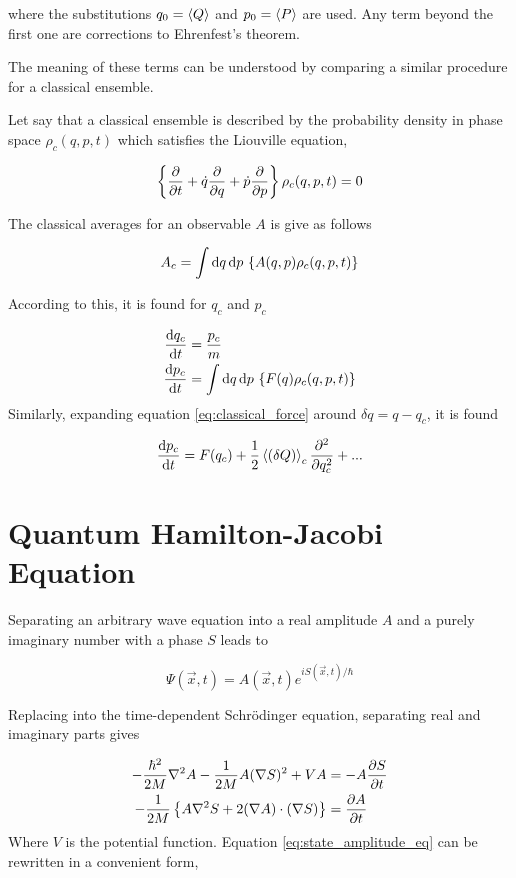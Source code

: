 where the substitutions $q_0 = \left\langle Q \right\rangle$ and $p_0 = \left\langle P \right\rangle$ are used. Any term beyond the first one are corrections to Ehrenfest's theorem.

The meaning of these terms can be understood by comparing a similar procedure for a classical ensemble. 

Let say that a classical ensemble is described by the probability density in phase space $\rho_c(q, p, t)$ which satisfies the Liouville equation,

\begin{equation}
    \left\{\frac{\partial }{\partial t} + \dot q \frac{\partial }{\partial q} + \dot p \frac{\partial }{\partial p}\right\}\rho_c(q, p, t) = 0 
\end{equation}

The classical averages for an observable $A$ is give as follows

\begin{equation}
    A_c = \int \text d{q}\,\text d{p} \,\left\{A(q,p)\rho_c(q, p, t)\right \}
\end{equation}

According to this, it is found for $q_c$ and $p_c$

\begin{align}
    \frac{\text d q_c}{\text d t} &= \dfrac{p_c}{m} \\
    \frac{\text d p_c}{\text d t} &= \int \text d{q}\,\text d{p} \,\left\{F(q)\rho_c(q, p, t)\right \} \label{eq:classical_force}
\end{align}
Similarly, expanding equation \eqref{eq:classical_force} around $\delta q = q - q_c$, it is found 

\begin{equation}
    \frac{\text d p_c}{\text d t} = F(q_c) + \dfrac{1}{2}\left\langle (\delta Q) \right\rangle_c\frac{\partial ^2}{\partial q_c^2} + ...
\end{equation}

\section{Quantum Hamilton-Jacobi Equation}
\label{sec:QHJ} 
Separating an arbitrary wave equation into a real amplitude $A$ and a purely imaginary number with a phase $S$ leads to

\begin{equation}    
    \Psi(\vec x, t) = A(\vec x, t)e^{iS(\vec x, t)/\hbar}
\end{equation}

Replacing into the time-dependent Schrödinger equation, separating real and imaginary parts gives

\begin{align}
    -\dfrac{\hbar^2}{2M}\nabla^2 A - \dfrac{1}{2M}A(\mathbf{\nabla} S)^2 + VA &= -A\frac{\partial S}{\partial t} \label{eq:state_phase_eq}\\
    -\dfrac{1}{2M}\left\{A\nabla^2 S + 2 (\nabla A)\cdot(\nabla S)\right\} &= \frac{\partial A}{\partial t} \label{eq:state_amplitude_eq}
\end{align}
Where $V$ is the potential function.
Equation \eqref{eq:state_amplitude_eq} can be rewritten in a convenient form,

